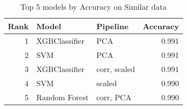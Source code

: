 \begin{table}[!htb]
\centering
\begin{tabular}{rllr}
\toprule
Rank & Model & Pipeline & Accuracy \\
\midrule
1 & XGBClassifier & PCA & 0.991 \\
2 & SVM & PCA & 0.991 \\
3 & XGBClassifier & corr, scaled & 0.991 \\
4 & SVM & scaled & 0.990 \\
5 & Random Forest & corr, PCA & 0.990 \\
\bottomrule
\end{tabular}
\caption{Top 5 models by Accuracy on Similar data}
\label{table-top-5-accuracy-similar}
\end{table}
